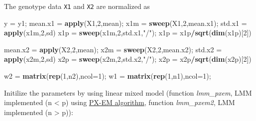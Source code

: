 \documentclass[]{article}
\newenvironment{Shaded}{\begin{snugshade}}{\end{snugshade}}
\newcommand{\KeywordTok}[1]{\textcolor[rgb]{0.13,0.29,0.53}{\textbf{#1}}}
\newcommand{\DataTypeTok}[1]{\textcolor[rgb]{0.13,0.29,0.53}{#1}}
\newcommand{\DecValTok}[1]{\textcolor[rgb]{0.00,0.00,0.81}{#1}}
\newcommand{\StringTok}[1]{\textcolor[rgb]{0.31,0.60,0.02}{#1}}
\newcommand{\OperatorTok}[1]{\textcolor[rgb]{0.81,0.36,0.00}{\textbf{#1}}}
\newcommand{\NormalTok}[1]{#1}
\begin{document}
The genotype data \texttt{X1} and \texttt{X2} are normalized as

\begin{Shaded}
\begin{Highlighting}[]
\NormalTok{y =}\StringTok{ }\NormalTok{y1;}
\NormalTok{mean.x1 =}\StringTok{ }\KeywordTok{apply}\NormalTok{(X1,}\DecValTok{2}\NormalTok{,mean);}
\NormalTok{x1m =}\StringTok{ }\KeywordTok{sweep}\NormalTok{(X1,}\DecValTok{2}\NormalTok{,mean.x1);}
\NormalTok{std.x1 =}\StringTok{ }\KeywordTok{apply}\NormalTok{(x1m,}\DecValTok{2}\NormalTok{,sd)}
\NormalTok{x1p =}\StringTok{ }\KeywordTok{sweep}\NormalTok{(x1m,}\DecValTok{2}\NormalTok{,std.x1,}\StringTok{"/"}\NormalTok{);}
\NormalTok{x1p =}\StringTok{ }\NormalTok{x1p}\OperatorTok{/}\KeywordTok{sqrt}\NormalTok{(}\KeywordTok{dim}\NormalTok{(x1p)[}\DecValTok{2}\NormalTok{])}

\NormalTok{mean.x2 =}\StringTok{ }\KeywordTok{apply}\NormalTok{(X2,}\DecValTok{2}\NormalTok{,mean);}
\NormalTok{x2m =}\StringTok{ }\KeywordTok{sweep}\NormalTok{(X2,}\DecValTok{2}\NormalTok{,mean.x2);}
\NormalTok{std.x2 =}\StringTok{ }\KeywordTok{apply}\NormalTok{(x2m,}\DecValTok{2}\NormalTok{,sd)}
\NormalTok{x2p =}\StringTok{ }\KeywordTok{sweep}\NormalTok{(x2m,}\DecValTok{2}\NormalTok{,std.x2,}\StringTok{"/"}\NormalTok{);}
\NormalTok{x2p =}\StringTok{ }\NormalTok{x2p}\OperatorTok{/}\KeywordTok{sqrt}\NormalTok{(}\KeywordTok{dim}\NormalTok{(x2p)[}\DecValTok{2}\NormalTok{])}

\NormalTok{w2 =}\StringTok{ }\KeywordTok{matrix}\NormalTok{(}\KeywordTok{rep}\NormalTok{(}\DecValTok{1}\NormalTok{,n2),}\DataTypeTok{ncol=}\DecValTok{1}\NormalTok{);}
\NormalTok{w1 =}\StringTok{ }\KeywordTok{matrix}\NormalTok{(}\KeywordTok{rep}\NormalTok{(}\DecValTok{1}\NormalTok{,n1),}\DataTypeTok{ncol=}\DecValTok{1}\NormalTok{);}
\end{Highlighting}
\end{Shaded}

Initilize the parameters by using linear mixed model (function
\emph{lmm\_pxem}, LMM implemented (n \textless{} p) using
\href{https://www.jstor.org/stable/2337481?seq=1\#page_scan_tab_contents}{PX-EM
algorithm}, function \emph{lmm\_pxem2}, LMM implemented (n
\textgreater{} p)):

\begin{Shaded}
\end{Shaded}
\end{document}
